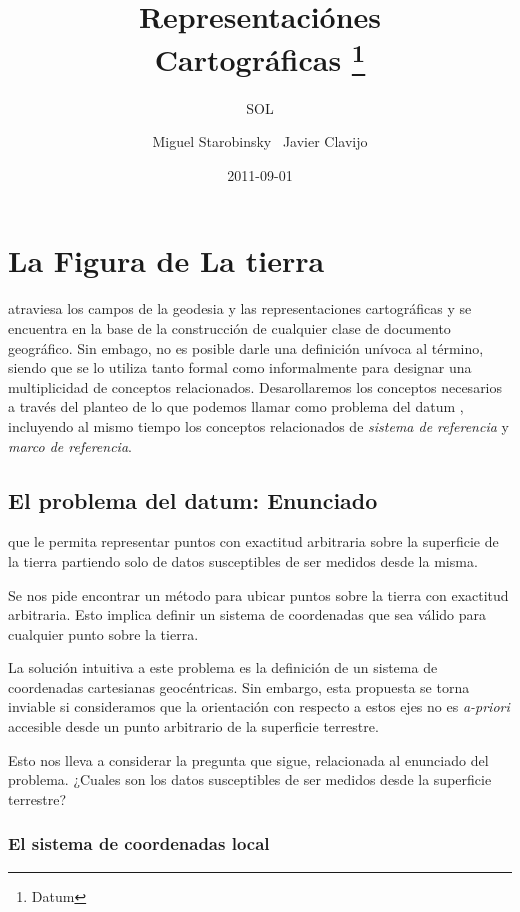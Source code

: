 \documentclass{tufte-book}
\author{SOL}
\date{2011-09-01}
\title{Representaciónes \\ Cartográficas \thanks{Datum}}
\author[Miguel Starobinsky \ Javier Clavijo]{Miguel Starobinsky \ Javier Clavijo}
\begin{document}
\maketitle

\chapter{La Figura de La tierra}

 atraviesa los campos de la geodesia y
las representaciones cartográficas y se encuentra en la base de la construcción
de cualquier clase de documento geográfico.
Sin embago, no es posible darle una definición unívoca al término, siendo que se
lo utiliza tanto formal como informalmente para designar una multiplicidad de
conceptos relacionados.
Desarollaremos los conceptos necesarios a través del planteo de lo que podemos llamar
como \guillemotleft problema del datum \guillemotright, incluyendo al mismo tiempo
los conceptos relacionados de \textit{sistema de referencia} y \textit{marco de referencia}.

\section{El problema del datum: Enunciado}

 que le permita representar
puntos con exactitud arbitraria sobre la superficie de la tierra partiendo solo de datos
susceptibles de ser medidos desde la misma. \guillemotright

Se nos pide encontrar un método para ubicar puntos sobre la tierra con exactitud
arbitraria. Esto implica definir un sistema de coordenadas que sea válido para cualquier
punto sobre la tierra.

La solución intuitiva a este problema es la definición de un sistema de coordenadas
cartesianas geocéntricas. Sin embargo, esta propuesta se torna inviable si consideramos
que la orientación con respecto a estos ejes no es \textit{a-priori} accesible
desde un punto arbitrario de la superficie terrestre.

Esto nos lleva a considerar la pregunta que sigue, relacionada al enunciado del problema.
¿Cuales son los datos susceptibles de ser medidos desde la superficie terrestre?

\subsection{El sistema de coordenadas local}
\end{document}
